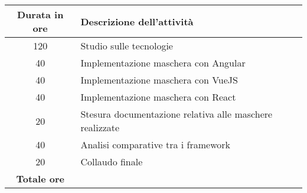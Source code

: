 

\begin{tabularx}{\textwidth}{|c|X|}
	\hline
	\textbf{Durata in ore} & \textbf{Descrizione dell'attività} \\\hline
	
	120 & Studio sulle tecnologie \\	 
    \hline
    
    40 & Implementazione maschera con Angular \\
    \hline
    40 & Implementazione maschera con VueJS \\
    \hline
	40 & Implementazione maschera con React \\
	\hline
	20 & Stesura documentazione relativa alle maschere realizzate \\
    \hline
    40 & Analisi comparative tra i framework \\
    \hline
    20 & Collaudo finale \\
  	\hline
	\textbf{Totale ore} & \textbf{\totaleOre} \\\hline
	
	
\end{tabularx}